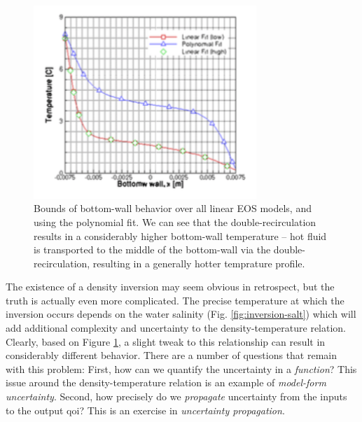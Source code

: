 \documentclass[../primer.tex]{subfiles}
\begin{document}
\begin{figure}[!ht]
  \includegraphics[width=0.75\textwidth]{./images/bot_wall_double}
  \caption{Bounds of bottom-wall behavior over all linear EOS models, and using
    the polynomial fit. We can see that the double-recirculation results in a
    considerably higher bottom-wall temperature -- hot fluid is transported to
    the middle of the bottom-wall via the double-recirculation, resulting in a
    generally hotter temprature profile.}
  \label{fig:bot-wall-double}
\end{figure}

\clearpage
The existence of a density inversion may seem obvious in retrospect, but the
truth is actually even more complicated. The precise temperature at which the
inversion occurs depends on the water salinity (Fig. \ref{fig:inversion-salt})
which will add additional complexity and uncertainty to the density-temperature
relation. Clearly, based on Figure \ref{fig:bot-wall-double}, a slight tweak to
this relationship can result in considerably different behavior. There are a
number of questions that remain with this problem: First, how can we quantify
the uncertainty in a \emph{function}? This issue around the density-temperature
relation is an example of \emph{model-form uncertainty}. Second, how precisely
do we \emph{propagate} uncertainty from the inputs to the output qoi? This is an
exercise in \emph{uncertainty propagation}.
\end{document}
